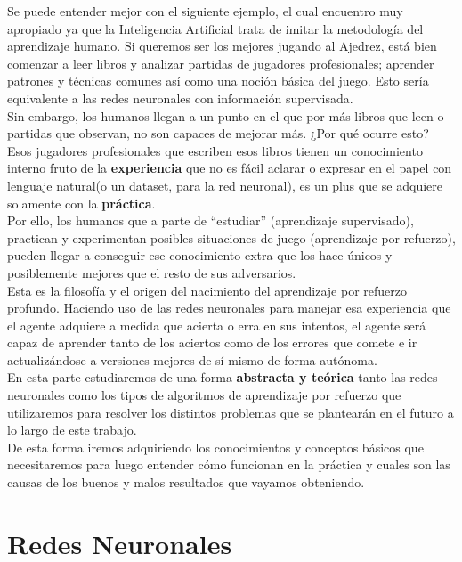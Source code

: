 \documentclass[11pt,fleqn]{book} %
\begin{document}
Se puede entender mejor con el siguiente ejemplo, el cual encuentro muy apropiado ya que la Inteligencia Artificial trata de imitar la metodología del aprendizaje humano. Si queremos ser los mejores jugando al Ajedrez, está bien comenzar a leer libros y analizar partidas de jugadores profesionales; aprender patrones y técnicas comunes así como una noción básica del juego. Esto sería equivalente a las redes neuronales con información supervisada. \\

Sin embargo, los humanos llegan a un punto en el que por más libros que leen o partidas que observan, no son capaces de mejorar más. ¿Por qué ocurre esto? Esos jugadores profesionales que escriben esos libros tienen un conocimiento interno fruto de la \textbf{experiencia} que no es fácil aclarar o expresar en el papel con lenguaje natural(o un dataset, para la red neuronal), es un plus que se adquiere solamente con la \textbf{práctica}. \\

Por ello, los humanos que a parte de ``estudiar'' (aprendizaje supervisado), practican y experimentan posibles situaciones de juego (aprendizaje por refuerzo), pueden llegar a conseguir ese conocimiento extra que los hace únicos y posiblemente mejores que el resto de sus adversarios. \\

Esta es la filosofía y el origen del nacimiento del aprendizaje por refuerzo profundo. Haciendo uso de las redes neuronales para manejar esa experiencia que el agente adquiere a medida que acierta o erra en sus intentos, el agente será capaz de aprender tanto de los aciertos como de los errores que comete e ir actualizándose a versiones mejores de sí mismo de forma autónoma. \\

En esta parte estudiaremos de una forma \textbf{abstracta y teórica} tanto las redes neuronales como los tipos de algoritmos de aprendizaje por refuerzo que utilizaremos para resolver los distintos problemas que se plantearán en el futuro a lo largo de este trabajo. \\

De esta forma iremos adquiriendo los conocimientos y conceptos básicos que necesitaremos para luego entender cómo funcionan en la práctica y cuales son las causas de los buenos y malos resultados que vayamos obteniendo.

\chapter{Redes Neuronales}\label{sec:deeplearning}
\end{document}
